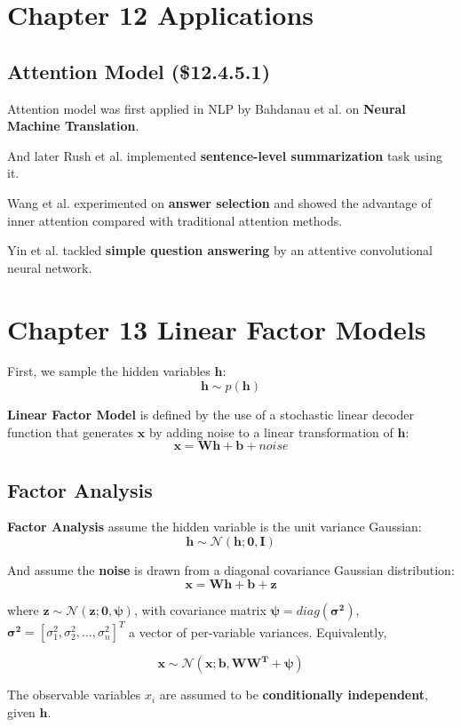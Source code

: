 \documentclass[12pt]{article}
\numberwithin{equation}{section}
\begin{document}
\section{Chapter 12 Applications}
\subsection{Attention Model (\$12.4.5.1)}
	Attention model was first applied in NLP by Bahdanau et al.\citep{bahdanau2014neural} on \textbf{Neural Machine Translation}.\par
	And later Rush et al.\citep{rush2015neural} implemented \textbf{sentence-level summarization} task using it. \par
	Wang et al.\citep{wang2016inner} experimented on \textbf{answer selection} and showed the advantage of inner attention compared with traditional attention methods. \par
	Yin et al.\citep{yin2016simple} tackled \textbf{simple question answering} by an attentive convolutional neural network. \par
\section{Chapter 13 Linear Factor Models}
First, we sample the hidden variables $\bm{h}$:
\begin{equation}
	\bm{h} \sim p(\bm{h})
\end{equation} \par
\textbf{Linear Factor Model} is defined by the use of a stochastic linear decoder function that generates $\bm{x}$ by adding noise to a linear transformation of $\bm{h}$:
\begin{equation}
	\bm{x} = \bm{Wh}+\bm{b}+noise
\end{equation} \par
\subsection{Factor Analysis}
	\textbf{Factor Analysis} assume the hidden variable is the unit variance Gaussian:
	\begin{equation}
		\bm{h} \sim \mathcal{N}(\bm{h;0,I})
	\end{equation} \par
	And assume the \textbf{noise} is drawn from a diagonal covariance Gaussian distribution:
	\begin{equation}
		\bm{x} = \bm{Wh}+\bm{b}+\bm{z}
	\end{equation} \par	
	where $\bm{z} \sim \mathcal{N}(\bm{z;0,\psi})$, with covariance matrix $\bm{\psi} = diag(\bm{\sigma^2})$, $\bm{\sigma^2}=[\sigma_1^2, \sigma_2^2,...,\sigma_n^2]^T$ a vector of per-variable variances. Equivalently, \par
	\begin{equation}
		\bm{x} \sim \mathcal{N}(\bm{x;b,WW^T+\psi})
	\end{equation} \par
	The observable variables $x_i$ are assumed to be \textbf{conditionally independent}, given $\bm{h}$.
\end{document}
